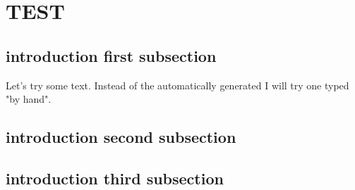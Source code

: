 \documentclass[crop=false]{standalone}
\begin{document}
\section{TEST}

\subsection{introduction first subsection}
Let's try some text. Instead of the automatically generated
I will try one typed "by hand".

\subsection{introduction second subsection}

\blindtext

\subsection{introduction third subsection}

\blindtext
\end{document}
